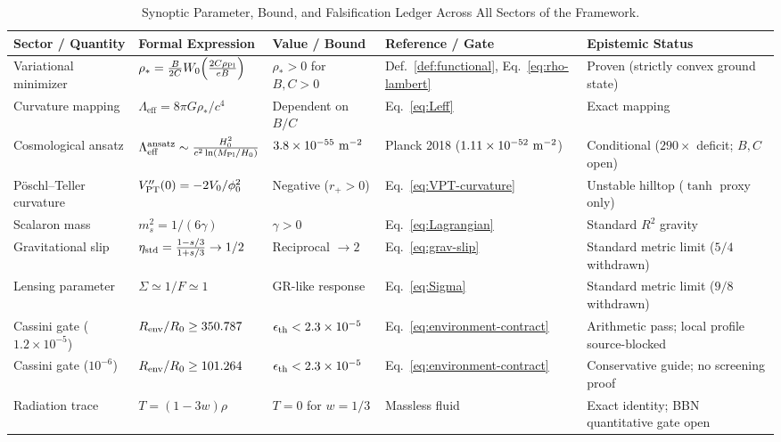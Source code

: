 \documentclass[12pt,a4paper]{article}
\theoremstyle{definition}
\theoremstyle{plain}
\theoremstyle{remark}
\newcommand{\Leff}{\Lambda_{\mathrm{eff}}}
\begin{document}
\begin{table}[htbp]
\centering
\small
\renewcommand{\arraystretch}{1.15}
\caption{Synoptic Parameter, Bound, and Falsification Ledger Across All Sectors of the Framework.}
\label{tab:parameter-bounds-ledger}\label{tab:parameter-schranken-ledger}
\begin{tabularx}{\linewidth}{@{}L{2.6cm}L{2.8cm}L{2.5cm}L{2.5cm}Y@{}}
\toprule
\textbf{Sector / Quantity} & \textbf{Formal Expression} & \textbf{Value / Bound} & \textbf{Reference / Gate} & \textbf{Epistemic Status}\\
\midrule
Variational minimizer & $\rho_\ast = \frac{B}{2C} W_0\!\left(\frac{2C\rho_{\rm Pl}}{eB}\right)$ & $\rho_\ast > 0$ for $B,C>0$ & Def.~\ref{def:functional}, Eq.~\eqref{eq:rho-lambert} & Proven (strictly convex ground state)\\
Curvature mapping & $\Leff = 8\pi G\rho_\ast/c^4$ & Dependent on $B/C$ & Eq.~\eqref{eq:Leff} & Exact mapping\\
Cosmological ansatz & $\Leff^{\rm ansatz} \sim \frac{H_0^2}{c^2\ln(M_{\rm Pl}/H_0)}$ & $3.8\times 10^{-55}\ {\rm m}^{-2}$ & Planck 2018 ($1.11\times 10^{-52}\ {\rm m}^{-2}$) & Conditional ($290\times$ deficit; $B, C$ open)\\
Pöschl--Teller curvature & $V_{\rm PT}''(0) = -2V_0/\phi_0^2$ & Negative ($r_+ > 0$) & Eq.~\eqref{eq:VPT-curvature} & Unstable hilltop ($\tanh$ proxy only)\\
Scalaron mass & $m_s^2 = 1/(6\gamma)$ & $\gamma > 0$ & Eq.~\eqref{eq:Lagrangian} & Standard $R^2$ gravity\\
Gravitational slip & $\eta_{\rm std} = \frac{1-s/3}{1+s/3} \to 1/2$ & Reciprocal $\to 2$ & Eq.~\eqref{eq:grav-slip} & Standard metric limit ($5/4$ withdrawn)\\
Lensing parameter & $\Sigma \simeq 1/F \simeq 1$ & GR-like response & Eq.~\eqref{eq:Sigma} & Standard metric limit ($9/8$ withdrawn)\\
Cassini gate ($1.2\times 10^{-5}$) & $R_{\rm env}/R_0 \ge 350.787$ & $\epsilon_{\rm th} < 2.3\times 10^{-5}$ & Eq.~\eqref{eq:environment-contract} & Arithmetic pass; local profile source-blocked\\
Cassini gate ($10^{-6}$) & $R_{\rm env}/R_0 \ge 101.264$ & $\epsilon_{\rm th} < 2.3\times 10^{-5}$ & Eq.~\eqref{eq:environment-contract} & Conservative guide; no screening proof\\
Radiation trace & $T = (1-3w)\rho$ & $T = 0$ for $w=1/3$ & Massless fluid & Exact identity; BBN quantitative gate open\\
\bottomrule
\end{tabularx}
\end{table}
\end{document}
